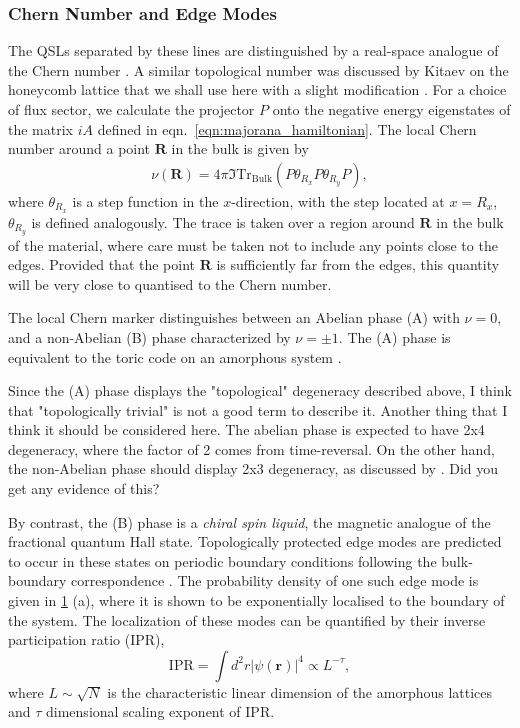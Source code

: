 \hypertarget{chern-number-and-edge-modes}{%
\subsubsection{Chern Number and Edge Modes}\label{chern-number-and-edge-modes}}

The QSLs separated by these lines are distinguished by a real-space analogue of the Chern number \autocite{bianco_mapping_2011,Hastings_Almost_2010}. A similar topological number was discussed by Kitaev on the honeycomb lattice \autocite{kitaevAnyonsExactlySolved2006} that we shall use here with a slight modification \autocite{peru_preprint,mitchellAmorphousTopologicalInsulators2018}. For a choice of flux sector, we calculate the projector \(P\) onto the negative energy eigenstates of the matrix \(iA\) defined in eqn.~\protect\hyperlink{eqn:majorana_hamiltonian}{{[}eqn:majorana\_hamiltonian{]}}. The local Chern number around a point \(\textbf{R}\) in the bulk is given by \[\begin{aligned}
    \nu (\textbf{R}) = 4\pi \Im \mathrm{Tr}_{\mathrm{Bulk}} 
    \left ( 
    P\theta_{R_x} P \theta_{R_y} P
    \right ),\end{aligned}\] where \(\theta_{R_x}\) is a step function in the \(x\)-direction, with the step located at \(x = R_x\), \(\theta_{R_y}\) is defined analogously. The trace is taken over a region around \(\textbf{R}\) in the bulk of the material, where care must be taken not to include any points close to the edges. Provided that the point \(\textbf{R}\) is sufficiently far from the edges, this quantity will be very close to quantised to the Chern number.

The local Chern marker distinguishes between an Abelian phase (A) with \(\nu = 0\), and a non-Abelian (B) phase characterized by \(\nu = \pm 1\). The (A) phase is equivalent to the toric code on an amorphous system \autocite{kitaev_fault-tolerant_2003}.

Since the (A) phase displays the "topological" degeneracy described above, I think that "topologically trivial" is not a good term to describe it. Another thing that I think it should be considered here. The abelian phase is expected to have 2x4 degeneracy, where the factor of 2 comes from time-reversal. On the other hand, the non-Abelian phase should display 2x3 degeneracy, as discussed by \autocite{yaoExactChiralSpin2007}. Did you get any evidence of this?

By contrast, the (B) phase is a \emph{chiral spin liquid}, the magnetic analogue of the fractional quantum Hall state. Topologically protected edge modes are predicted to occur in these states on periodic boundary conditions following the bulk-boundary correspondence \autocite{qi_general_2006}. The probability density of one such edge mode is given in \protect\hyperlink{fig:edge_modes}{1} (a), where it is shown to be exponentially localised to the boundary of the system. The localization of these modes can be quantified by their inverse participation ratio (IPR), \[\mathrm{IPR} = \int d^2r|\psi(\mathbf{r})|^4  \propto L^{-\tau},\] where \(L\sim\sqrt{N}\) is the characteristic linear dimension of the amorphous lattices and \(\tau\) dimensional scaling exponent of IPR.

